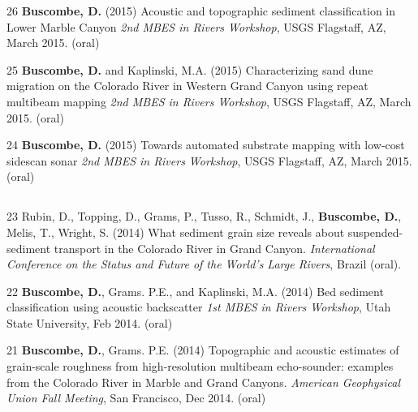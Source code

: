 \documentclass[margin,line]{resume}
\begin{document}
\begin{resume}
\begin{footnotesize}
\begin{list1}

        \item[26] {\bf Buscombe, D.} (2015) Acoustic and topographic sediment classification in Lower Marble Canyon {\sl 2nd MBES in Rivers Workshop}, USGS Flagstaff, AZ, March 2015. (oral)\\
        
        \item[25] {\bf Buscombe, D.} and Kaplinski, M.A. (2015) Characterizing sand dune migration on the Colorado River in Western Grand Canyon using repeat multibeam mapping {\sl 2nd MBES in Rivers Workshop}, USGS Flagstaff, AZ, March 2015. (oral)\\

        \item[24] {\bf Buscombe, D.} (2015) Towards automated substrate mapping with low-cost sidescan sonar {\sl 2nd MBES in Rivers Workshop}, USGS Flagstaff, AZ, March 2015. (oral)
        
	\end{list1}

	\subsection{}
	\begin{list1}
        \item[23] Rubin, D., Topping, D., Grams, P., Tusso, R., Schmidt, J., {\bf Buscombe, D.}, Melis, T., Wright, S. (2014) What sediment grain size reveals about suspended-sediment transport in the Colorado River in Grand Canyon. {\sl International Conference on the Status and Future of the World's Large Rivers}, Brazil (oral).\\

        \item[22] {\bf Buscombe, D.}, Grams. P.E., and Kaplinski, M.A. (2014) Bed sediment classification using acoustic backscatter {\sl 1st MBES in Rivers Workshop}, Utah State University, Feb 2014. (oral)\\

        \item[21] {\bf Buscombe, D.}, Grams. P.E. (2014) Topographic and acoustic estimates of grain-scale roughness from high-resolution multibeam echo-sounder: examples from the Colorado River in Marble and Grand Canyons. {\sl American Geophysical Union Fall Meeting}, San Francisco, Dec 2014. (oral)
	\end{list1}
	

\end{footnotesize}
\end{resume}
\end{document}
